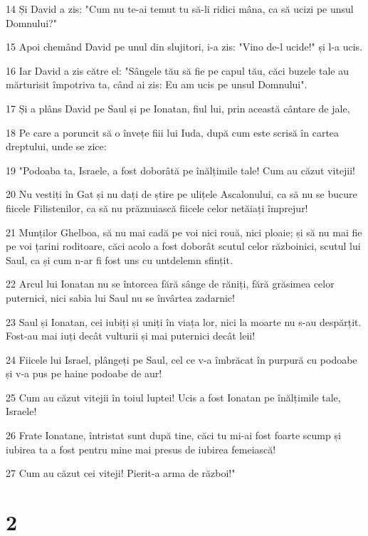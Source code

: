 \par 14 Și David a zis: "Cum nu te-ai temut tu să-li ridici mâna, ca să ucizi pe unsul Domnului?"
\par 15 Apoi chemând David pe unul din slujitori, i-a zis: "Vino de-l ucide!" și l-a ucis.
\par 16 Iar David a zis către el: "Sângele tău să fie pe capul tău, căci buzele tale au mărturisit împotriva ta, când ai zis: Eu am ucis pe unsul Domnului".
\par 17 Și a plâns David pe Saul și pe Ionatan, fiul lui, prin această cântare de jale,
\par 18 Pe care a poruncit să o învețe fiii lui Iuda, după cum este scrisă în cartea dreptului, unde se zice:
\par 19 "Podoaba ta, Israele, a fost doborâtă pe înălțimile tale! Cum au căzut vitejii!
\par 20 Nu vestiți în Gat și nu dați de știre pe ulițele Ascalonului, ca să nu se bucure fiicele Filistenilor, ca să nu prăznuiască fiicele celor netăiați împrejur!
\par 21 Munților Ghelboa, să nu mai cadă pe voi nici rouă, nici ploaie; și să nu mai fie pe voi țarini roditoare, căci acolo a fost doborât scutul celor războinici, scutul lui Saul, ca și cum n-ar fi fost uns cu untdelemn sfințit.
\par 22 Arcul lui Ionatan nu se întorcea fără sânge de răniți, fără grăsimea celor puternici, nici sabia lui Saul nu se învârtea zadarnic!
\par 23 Saul și Ionatan, cei iubiți și uniți în viața lor, nici la moarte nu s-au despărțit. Fost-au mai iuți decât vulturii și mai puternici decât leii!
\par 24 Fiicele lui Israel, plângeți pe Saul, cel ce v-a îmbrăcat în purpură cu podoabe și v-a pus pe haine podoabe de aur!
\par 25 Cum au căzut vitejii în toiul luptei! Ucis a fost Ionatan pe înălțimile tale, Israele!
\par 26 Frate Ionatane, întristat sunt după tine, căci tu mi-ai fost foarte scump și iubirea ta a fost pentru mine mai presus de iubirea femeiască!
\par 27 Cum au căzut cei viteji! Pierit-a arma de război!"

\chapter{2}

